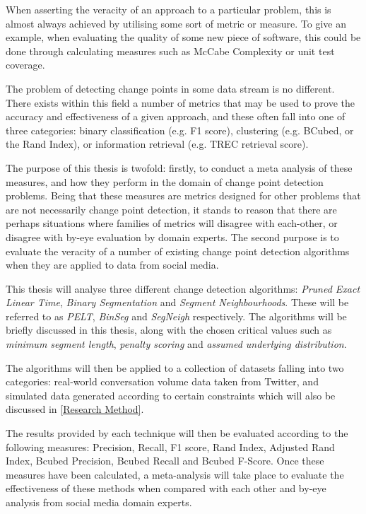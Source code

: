 \documentclass{uvamscse}	%
\begin{document}
When asserting the veracity of an approach to a particular problem, this is almost always achieved by utilising some sort of metric or measure. To give an example, when evaluating the quality of some new piece of software, this could be done through calculating measures such as McCabe Complexity or unit test coverage.

The problem of detecting change points in some data stream is no different. There exists within this field a number of metrics that may be used to prove the accuracy and effectiveness of a given approach, and these often fall into one of three categories: binary classification (e.g. F1 score), clustering (e.g. BCubed, or the Rand Index), or information retrieval (e.g. TREC retrieval score).

The purpose of this thesis is twofold: firstly, to conduct a meta analysis of these measures, and how they perform in the domain of change point detection problems. Being that these measures are metrics designed for other problems that are not necessarily change point detection, it stands to reason that there are perhaps situations where families of metrics will disagree with each-other, or disagree with by-eye evaluation by domain experts. The second purpose is to evaluate the veracity of a number of existing change point detection algorithms when they are applied to data from social media.

This thesis will analyse three different change detection algorithms: \emph{Pruned Exact Linear Time}, \emph{Binary Segmentation} and \emph{Segment Neighbourhoods}. These will be referred to as \emph{PELT}, \emph{BinSeg} and \emph{SegNeigh} respectively. The algorithms will be briefly discussed in this thesis, along with the chosen critical values such as \emph{minimum segment length}, \emph{penalty scoring} and \emph{assumed underlying distribution}.

The algorithms will then be applied to a collection of datasets falling into two categories: real-world conversation volume data taken from Twitter, and simulated data generated according to certain constraints which will also be discussed in \autoref{Research Method}.

The results provided by each technique will then be evaluated according to the following measures: Precision, Recall, F1 score, Rand Index, Adjusted Rand Index, Bcubed Precision, Bcubed Recall and Bcubed F-Score. Once these measures have been calculated, a meta-analysis will take place to evaluate the effectiveness of these methods when compared with each other and by-eye analysis from social media domain experts.
\end{document}

